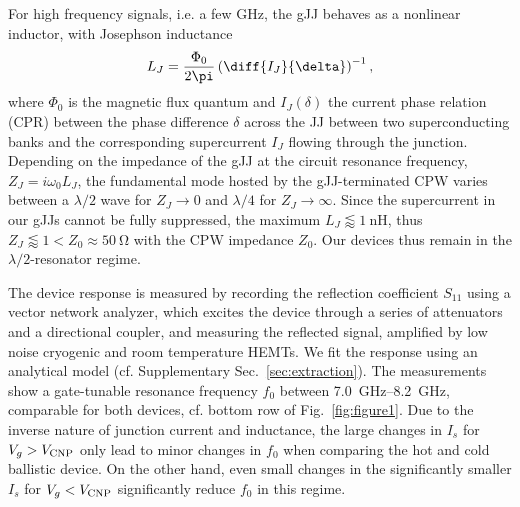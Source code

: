 For high frequency signals, i.e. a few \si{\giga\hertz}, the gJJ behaves as a nonlinear inductor, with Josephson inductance
%
\begin{align}
L_J = \frac{\Phi_0}{2\pi}\left(\diff{I_J}{\delta}\right)^{-1},
\label{eq:LJgeneral}
\end{align}
%
where $\Phi_0$ is the magnetic flux quantum and $I_J(\delta)$ the current phase relation (CPR) between the phase difference $\delta$ across the JJ between two superconducting banks and the corresponding supercurrent $I_J$ flowing through the junction.
Depending on the impedance of the gJJ at the circuit resonance frequency, $Z_J=i\omega_0 L_J$, the fundamental mode hosted by the gJJ-terminated CPW varies between a $\lambda/2$ wave for $Z_J\rightarrow0$ and $\lambda/4$ for $Z_J\rightarrow\infty$.
%
Since the supercurrent in our gJJs cannot be fully suppressed, the maximum $L_J\lessapprox\SI{1}{\nano\henry}$, thus $Z_J\lessapprox1 <  Z_0\approx\SI{50}{\ohm}$ with the CPW impedance $Z_0$.
%
Our devices thus remain in the $\lambda/2$-resonator regime.

The device response is measured by recording the reflection coefficient $S_{11}$ using a vector network analyzer, which excites the device through a series of attenuators and a directional coupler, and measuring the reflected signal, amplified by low noise cryogenic and room temperature HEMTs. 
%
We fit the response using an analytical model (cf. Supplementary Sec.~\ref{sec:extraction}).
%
The measurements show a gate-tunable resonance frequency $f_0$ between \SIrange{7.0}{8.2}{\giga\hertz}, comparable for both devices, cf. bottom row of Fig.~\ref{fig:figure1}.
%
Due to the inverse nature of junction current and inductance, the large changes in $I_s$ for $V_g>V_{\rm CNP}$ only lead to minor changes in $f_0$ when comparing the hot and cold ballistic device.
%
On the other hand, even small changes in the significantly smaller $I_s$ for $V_g<V_{\rm CNP}$ significantly reduce $f_0$ in this regime.

